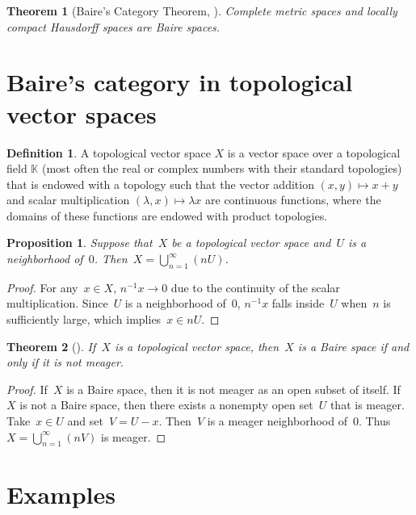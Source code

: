 \documentclass[11pt,a4paper]{article}  %
\newtheorem{theorem}{Theorem}[section]
\newtheorem{proposition}{Proposition}[section]
\theoremstyle{definition}
\newtheorem{definition}{Definition}[section]
\def\KK{\mathbb{K}}
\numberwithin{equation}{section}
\begin{document}
\begin{theorem}[Baire's Category Theorem, {\cite[Theorem~48.2]{Munkres_2000}}]
  \label{th:Baire}
  Complete metric spaces and locally compact Hausdorff spaces are Baire spaces.
\end{theorem}


\section{Baire's category in topological vector spaces}

\begin{definition}
 A topological vector space $X$ is a vector space over a topological field $\KK$ (most often the
 real or complex numbers with their standard topologies) that is endowed with a topology such that
 the vector addition $(x,y)\mapsto x+y$ and scalar multiplication $(\lambda, x) \mapsto \lambda x$ are continuous functions, where the domains of these
 functions are endowed with product topologies.
\end{definition}

\begin{proposition}
  Suppose that~$X$ be a topological vector space and~$U$ is a neighborhood of~$0$.
  Then~$X=\bigcup_{n=1}^\infty (nU)$.
\end{proposition}

\begin{proof}
  For any~$x\in X$, $n^{-1} x\to 0$ due to the continuity of the scalar multiplication.
  Since~$U$ is a neighborhood of~$0$,
  $n^{-1} x$ falls inside~$U$ when~$n$ is sufficiently large, which implies~$x\in n U$.
\end{proof}

\begin{theorem}[{\cite[Theorem~11.6.7]{Narici_Beckenstein_2010}}]
  If~$X$ is a topological vector space, then~$X$ is a Baire space if and only if it is not meager.
\end{theorem}

\begin{proof}
 If~$X$ is a Baire space, then it is not meager as an open subset of itself.  If~$X$ is not a Baire
 space, then there exists a nonempty open set~$U$ that is meager. Take~$x\in U$ and set~$V=U-x$.
 Then~$V$ is a meager neighborhood of~$0$. Thus~$X=\bigcup_{n=1}^\infty (nV)$ is meager.
\end{proof}

\section{Examples}
\end{document}
